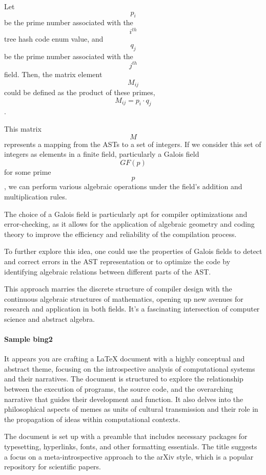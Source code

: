 \documentclass{article}
\begin{document}
Let $$ p_i $$ be the prime number associated with the $$ i^{th} $$ tree hash code enum value, and $$ q_j $$ be the prime number associated with the $$ j^{th} $$ field. Then, the matrix element $$ M_{ij} $$ could be defined as the product of these primes, $$ M_{ij} = p_i \cdot q_j $$.

This matrix $$ M $$ represents a mapping from the ASTs to a set of integers. If we consider this set of integers as elements in a finite field, particularly a Galois field $$ GF(p) $$ for some prime $$ p $$, we can perform various algebraic operations under the field's addition and multiplication rules.

The choice of a Galois field is particularly apt for compiler optimizations and error-checking, as it allows for the application of algebraic geometry and coding theory to improve the efficiency and reliability of the compilation process.

To further explore this idea, one could use the properties of Galois fields to detect and correct errors in the AST representation or to optimize the code by identifying algebraic relations between different parts of the AST.

This approach marries the discrete structure of compiler design with the continuous algebraic structures of mathematics, opening up new avenues for research and application in both fields. It's a fascinating intersection of computer science and abstract algebra.

\paragraph{Sample bing2}

It appears you are crafting a LaTeX document with a highly conceptual and abstract theme, focusing on the introspective analysis of computational systems and their narratives. The document is structured to explore the relationship between the execution of programs, the source code, and the overarching narrative that guides their development and function. It also delves into the philosophical aspects of memes as units of cultural transmission and their role in the propagation of ideas within computational contexts.

The document is set up with a preamble that includes necessary packages for typesetting, hyperlinks, fonts, and other formatting essentials. The title suggests a focus on a meta-introspective approach to the arXiv style, which is a popular repository for scientific papers.
\end{document}
